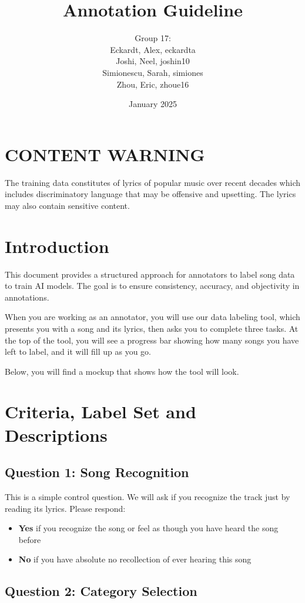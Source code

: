 \documentclass{article}
\title{Annotation Guideline}
\author{Group 17:\\ Eckardt, Alex, eckardta\\
Joshi, Neel, joshin10\\
Simionescu, Sarah, simiones\\
Zhou, Eric, zhoue16}
\date{January 2025}
\begin{document}
\maketitle

\section{CONTENT WARNING}
The training data constitutes of lyrics of popular music over recent decades which includes discriminatory language that may be offensive and upsetting. The lyrics may also contain sensitive content.



\section{Introduction}
This document provides a structured approach for annotators to label song data to train AI models. The goal is to ensure consistency, accuracy, and objectivity in annotations.

When you are working as an annotator, you will use our data labeling tool, which presents you with a song and its lyrics, then asks you to complete three tasks. At the top of the tool, you will see a progress bar showing how many songs you have left to label, and it will fill up as you go.

Below, you will find a mockup that shows how the tool will look.




\section{Criteria, Label Set and Descriptions}
\subsection{Question 1: Song Recognition}
This is a simple control question. We will ask if you recognize the track just by reading its lyrics. Please respond:

\begin{itemize}
    \item \textbf{Yes} if you recognize the song or feel as though you have heard the song before
    \item \textbf{No} if you have absolute no recollection of ever hearing this song
\end{itemize}


\subsection{Question 2: Category Selection}
\end{document}
